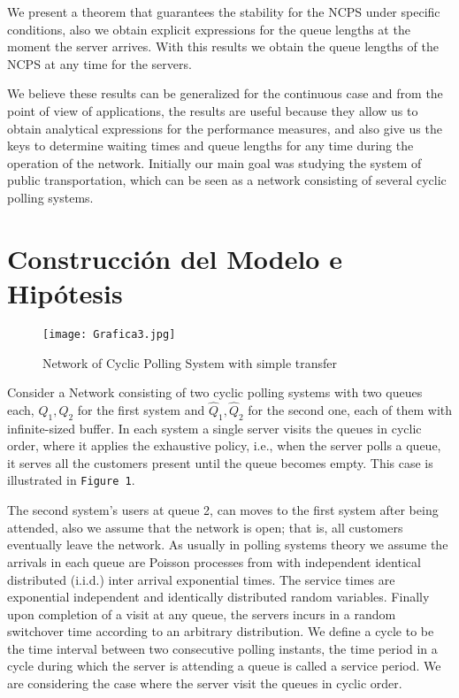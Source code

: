 We present a theorem that guarantees the stability for the NCPS under specific conditions, also we obtain explicit expressions for the queue lengths at the moment the server arrives. With this results we obtain the queue lengths of the NCPS at any time for the servers.

We believe these results can be generalized for the continuous case and from the point of view of applications, the results are useful because they allow us to obtain analytical expressions for the performance measures, and also give us the keys to determine waiting times and queue lengths for any time during the operation of the network. Initially our main goal was studying the system of public transportation, which can be seen as a network consisting of several cyclic polling systems.

%
\section{Construcci\'on del Modelo e Hip\'otesis}
%
\begin{figure}[H]\caption{Network of Cyclic Polling System with simple transfer}
\centering
\texttt{[image: Grafica3.jpg]}
\end{figure}\label{FigureRSVC}

Consider a Network consisting of two cyclic polling systems with two queues each, $Q_{1}, Q_{2}$ for the first system and $\hat{Q}_{1},\hat{Q}_{2}$ for the second one, each of them with infinite-sized buffer. In each system a single server visits the queues in cyclic order, where it applies the exhaustive policy, i.e., when the server polls a queue, it serves all the customers present until the queue becomes empty. This case is illustrated in \texttt{Figure 1}. 

The second system's users at queue 2, can moves to the first system after being attended, also we assume that the network is open; that is, all customers eventually leave the network. As usually in polling systems theory we assume the arrivals in each queue are Poisson processes from with independent identical distributed (i.i.d.) inter arrival exponential times. The service times are exponential independent and identically distributed random variables. Finally upon completion of a visit at any queue, the servers incurs in a random switchover time according to an arbitrary distribution. We define a cycle to be the time interval between two consecutive polling instants, the time period in a cycle during which the server is attending a queue is called a service period. We are considering the case where the server visit the queues in cyclic order.

